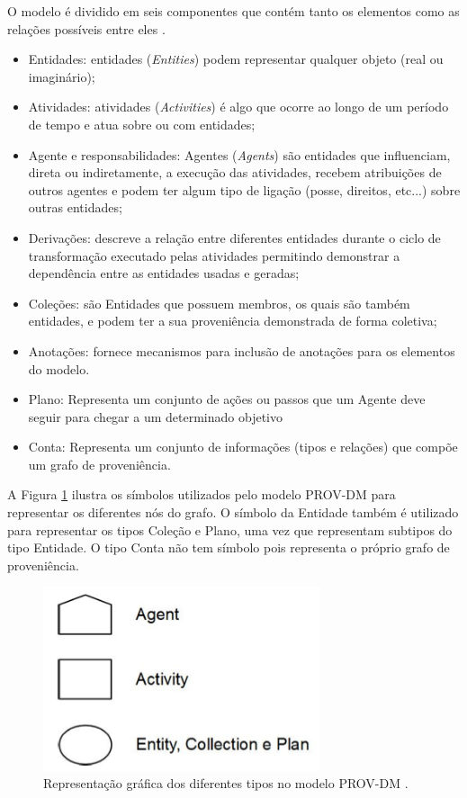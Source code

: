 O modelo é dividido em seis componentes que contém tanto os elementos como as relações possíveis entre eles \cite{w3c}.

\begin{itemize}
\item Entidades: entidades (\textit{Entities}) podem representar qualquer objeto (real ou imaginário); 
\item Atividades: atividades (\textit{Activities}) é algo que ocorre ao longo de um período de tempo e atua sobre ou com entidades;
\item Agente e responsabilidades: Agentes (\textit{Agents}) são entidades que influenciam, direta ou indiretamente, a execução das atividades, recebem atribuições de outros agentes e podem ter algum tipo de ligação (posse, direitos, etc...) sobre outras entidades;
\item Derivações: descreve a relação entre diferentes entidades durante o ciclo de transformação executado pelas atividades permitindo demonstrar a dependência entre as entidades usadas e geradas;
\item Coleções: são Entidades que possuem membros, os quais são também entidades, e podem ter a sua proveniência demonstrada de forma coletiva;
\item Anotações: fornece mecanismos para inclusão de anotações para os elementos do modelo.
\item Plano: Representa um conjunto de ações ou passos que um Agente deve seguir para chegar a um determinado objetivo
\item Conta: Representa um conjunto de informações (tipos e relações) que compõe um grafo de proveniência.
\end{itemize}

A Figura \ref{fig:entidadeprovdm} ilustra os símbolos utilizados pelo modelo PROV-DM para representar os diferentes nós do grafo. O símbolo da Entidade também é utilizado para representar os tipos Coleção e Plano, uma vez que representam subtipos do tipo Entidade. O tipo Conta não tem símbolo pois representa o próprio grafo de proveniência.

\begin{figure}[!ht]
\centering
\includegraphics[width=230pt]{images/Figura21.png}
\caption{Representação gráfica dos diferentes tipos no modelo PROV-DM \cite{w3c}.}
\label{fig:entidadeprovdm}
\end{figure}

